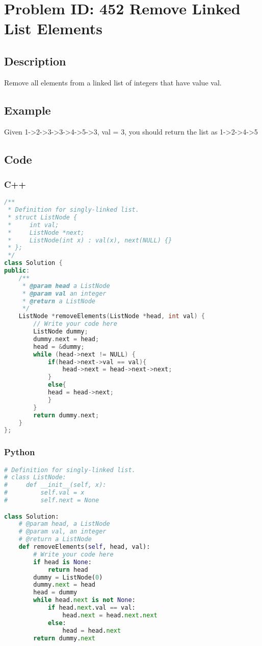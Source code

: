 \section{Problem ID: 452 Remove Linked List Elements}
\subsection{Description}
Remove all elements from a linked list of integers that have value val.

\subsection{Example}
Given 1->2->3->3->4->5->3, val = 3, you should return the list as 1->2->4->5

\subsection{Code}
\scriptsize
\subsubsection{C++}
\begin{lstlisting}[language=C++]
/**
 * Definition for singly-linked list.
 * struct ListNode {
 *     int val;
 *     ListNode *next;
 *     ListNode(int x) : val(x), next(NULL) {}
 * };
 */
class Solution {
public:
    /**
     * @param head a ListNode
     * @param val an integer
     * @return a ListNode
     */
    ListNode *removeElements(ListNode *head, int val) {
        // Write your code here
        ListNode dummy;
        dummy.next = head;
        head = &dummy;
        while (head->next != NULL) {
            if(head->next->val == val){
                head->next = head->next->next;
            }
            else{
            head = head->next;
            }
        }
        return dummy.next;
    }
};
\end{lstlisting}

\subsubsection{Python}
\begin{lstlisting}[language=Python]
# Definition for singly-linked list.
# class ListNode:
#     def __init__(self, x):
#         self.val = x
#         self.next = None

class Solution:
    # @param head, a ListNode
    # @param val, an integer
    # @return a ListNode
    def removeElements(self, head, val):
        # Write your code here
        if head is None:
            return head
        dummy = ListNode(0)
        dummy.next = head
        head = dummy
        while head.next is not None:
            if head.next.val == val:
                head.next = head.next.next
            else:
                head = head.next
        return dummy.next
\end{lstlisting}
\normalsize 